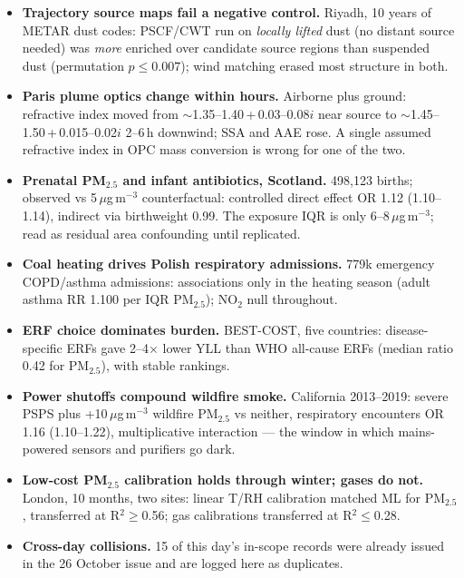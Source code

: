 \documentclass[10pt]{article}
\begin{document}
\footnotesize
\begin{itemize}

\item \textbf{Trajectory source maps fail a negative control.} Riyadh, 10 years of METAR dust codes: PSCF/CWT run on
\emph{locally lifted} dust (no distant source needed) was \emph{more} enriched over candidate source regions than
suspended dust (permutation $p\le0.007$); wind matching erased most structure in both.

\item \textbf{Paris plume optics change within hours.} Airborne plus ground: refractive index moved from
$\sim$1.35--1.40\,+\,0.03--0.08$i$ near source to $\sim$1.45--1.50\,+\,0.015--0.02$i$ 2--6\,h downwind; SSA and AAE
rose. A single assumed refractive index in OPC mass conversion is wrong for one of the two.

\item \textbf{Prenatal PM$_{2.5}$ and infant antibiotics, Scotland.} 498,123 births; observed vs 5\,$\mu$g\,m$^{-3}$
counterfactual: controlled direct effect OR 1.12 (1.10--1.14), indirect via birthweight 0.99. The exposure IQR is only
6--8\,$\mu$g\,m$^{-3}$; read as residual area confounding until replicated.

\item \textbf{Coal heating drives Polish respiratory admissions.} 779k emergency COPD/asthma admissions: associations
only in the heating season (adult asthma RR 1.100 per IQR PM$_{2.5}$); NO$_2$ null throughout.

\item \textbf{ERF choice dominates burden.} BEST-COST, five countries: disease-specific ERFs gave 2--4$\times$ lower
YLL than WHO all-cause ERFs (median ratio 0.42 for PM$_{2.5}$), with stable rankings.

\item \textbf{Power shutoffs compound wildfire smoke.} California 2013--2019: severe PSPS plus +10\,$\mu$g\,m$^{-3}$
wildfire PM$_{2.5}$ vs neither, respiratory encounters OR 1.16 (1.10--1.22), multiplicative interaction --- the window
in which mains-powered sensors and purifiers go dark.

\item \textbf{Low-cost PM$_{2.5}$ calibration holds through winter; gases do not.} London, 10 months, two sites: linear
T/RH calibration matched ML for PM$_{2.5}$, transferred at R$^2\ge$0.56; gas calibrations transferred at R$^2\le$0.28.

\item \textbf{Cross-day collisions.} 15 of this day's in-scope records were already issued in the 26 October issue and
are logged here as duplicates.

\end{itemize}
\end{document}

